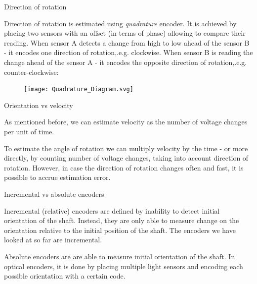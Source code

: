 \documentclass{beamer}
\begin{document}
\begin{frame}{Direction of rotation}
	\begin{flushleft}
		
		Direction of rotation is estimated using \emph{quadrature} encoder. It is achieved by placing two sensors with an offset (in terms of phase) allowing to compare their reading. When sensor A detects a change from high to low ahead of the sensor B - it encodes one direction of rotation,.e.g. clockwise. When sensor B is reading the change ahead of the sensor A - it encodes the opposite direction of rotation,.e.g. counter-clockwise:
		
		\begin{figure}
			\centering
			\texttt{[image: Quadrature\_Diagram.svg]}
			\label{fig:quadraturediagram}
		\end{figure}
		
		
	\end{flushleft}
\end{frame}



\begin{frame}{Orientation vs velocity}
	\begin{flushleft}
		
		As mentioned before, we can estimate velocity as the number of voltage changes per unit of time. 
		
		\bigskip
		
		To estimate the angle of rotation we can multiply velocity by the time - or more directly, by counting number of voltage changes, taking into account direction of rotation. However, in case the direction of rotation changes often and fast, it is possible to accrue estimation error.
		
		
	\end{flushleft}
\end{frame}


\begin{frame}{Incremental vs absolute encoders}
	\begin{flushleft}
		
		Incremental (relative) encoders are defined by inability to detect initial orientation of the shaft. Instead, they are only able to measure change on the orientation relative to the initial position of the shaft. The encoders we have looked at so far are incremental.
		
		\bigskip
		
		Absolute encoders are are able to measure initial orientation of the shaft. In optical encoders, it is done by placing multiple light sensors and encoding each possible orientation with a certain code.
		
	\end{flushleft}
\end{frame}
\end{document}
